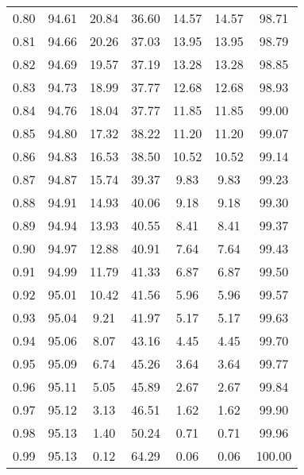 \begin{tabular}{|c|c|c|c|c|c|c|}
      0.80 &     94.61 &     20.84 &      36.60 &   14.57 &      14.57 &         98.71 \\
      0.81 &     94.66 &     20.26 &      37.03 &   13.95 &      13.95 &         98.79 \\
      0.82 &     94.69 &     19.57 &      37.19 &   13.28 &      13.28 &         98.85 \\
      0.83 &     94.73 &     18.99 &      37.77 &   12.68 &      12.68 &         98.93 \\
      0.84 &     94.76 &     18.04 &      37.77 &   11.85 &      11.85 &         99.00 \\
      0.85 &     94.80 &     17.32 &      38.22 &   11.20 &      11.20 &         99.07 \\
      0.86 &     94.83 &     16.53 &      38.50 &   10.52 &      10.52 &         99.14 \\
      0.87 &     94.87 &     15.74 &      39.37 &    9.83 &       9.83 &         99.23 \\
      0.88 &     94.91 &     14.93 &      40.06 &    9.18 &       9.18 &         99.30 \\
      0.89 &     94.94 &     13.93 &      40.55 &    8.41 &       8.41 &         99.37 \\
      0.90 &     94.97 &     12.88 &      40.91 &    7.64 &       7.64 &         99.43 \\
      0.91 &     94.99 &     11.79 &      41.33 &    6.87 &       6.87 &         99.50 \\
      0.92 &     95.01 &     10.42 &      41.56 &    5.96 &       5.96 &         99.57 \\
      0.93 &     95.04 &      9.21 &      41.97 &    5.17 &       5.17 &         99.63 \\
      0.94 &     95.06 &      8.07 &      43.16 &    4.45 &       4.45 &         99.70 \\
      0.95 &     95.09 &      6.74 &      45.26 &    3.64 &       3.64 &         99.77 \\
      0.96 &     95.11 &      5.05 &      45.89 &    2.67 &       2.67 &         99.84 \\
      0.97 &     95.12 &      3.13 &      46.51 &    1.62 &       1.62 &         99.90 \\
      0.98 &     95.13 &      1.40 &      50.24 &    0.71 &       0.71 &         99.96 \\
      0.99 &     95.13 &      0.12 &      64.29 &    0.06 &       0.06 &        100.00 \\
\bottomrule
\end{tabular}
